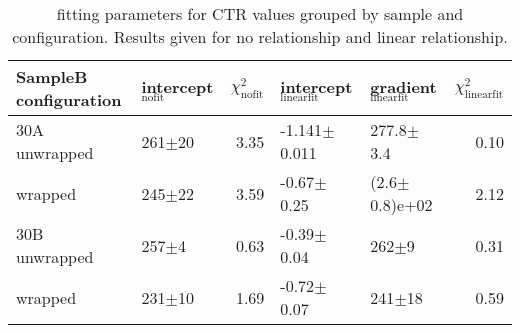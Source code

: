 \begin{table}
\caption{\label{tab:doiresults} fitting parameters for CTR values grouped by sample and configuration. Results given for no relationship and linear relationship.}
\begin{tabular}{llrllr}
\hline
SampleB configuration & intercept$_\text{nofit}$ &  $\chi^2_\text{nofit}$ & intercept$_\text{linearfit}$ & gradient$_\text{linearfit}$ &  $\chi^2_\text{linearfit}$ \\
\hline
30A     unwrapped     &      261$\pm$20 &                   3.35 &    -1.141$\pm$0.011 &      277.8$\pm$3.4 &                    0.10 \\
        wrapped       &      245$\pm$22 &                   3.59 &      -0.67$\pm$0.25 &  (2.6$\pm$0.8)e+02 &                    2.12 \\
30B     unwrapped     &       257$\pm$4 &                   0.63 &      -0.39$\pm$0.04 &          262$\pm$9 &                    0.31 \\
        wrapped       &      231$\pm$10 &                   1.69 &      -0.72$\pm$0.07 &         241$\pm$18 &                    0.59 \\
\hline
\end{tabular}
\end{table}